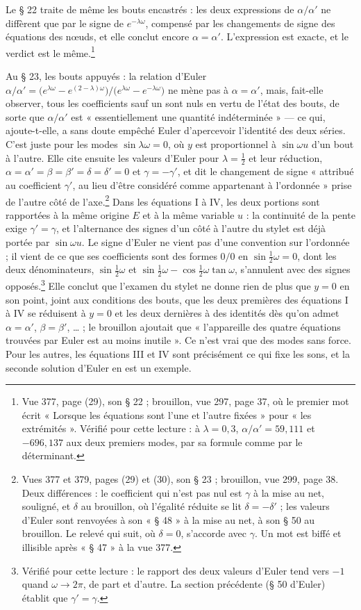 \documentclass[11pt,a4paper]{article}
\begin{document}
Le § 22 traite de même les bouts encastrés : les deux expressions de $\alpha/\alpha'$ ne diffèrent que par le signe de $e^{-\lambda\omega}$, compensé par les changements de signe des équations des nœuds, et elle conclut encore $\alpha=\alpha'$. L'expression est exacte, et le verdict est le même.\footnote{Vue 377, page (29), son § 22 ; brouillon, vue 297, page 37, où le premier mot écrit « Lorsque les équations sont l'une et l'autre fixées » pour « les extrémités ». Vérifié pour cette lecture : à $\lambda=0{,}3$, $\alpha/\alpha'=59{,}111$ et $-696{,}137$ aux deux premiers modes, par sa formule comme par le déterminant.}

Au § 23, les bouts appuyés : la relation d'Euler $\alpha/\alpha'=\bigl(e^{\lambda\omega}-e^{(2-\lambda)\omega}\bigr)/\bigl(e^{\lambda\omega}-e^{-\lambda\omega}\bigr)$ ne mène pas à $\alpha=\alpha'$, mais, fait-elle observer, tous les coefficients sauf un sont nuls en vertu de l'état des bouts, de sorte que $\alpha/\alpha'$ est « essentiellement une quantité indéterminée » — ce qui, ajoute-t-elle, a sans doute empêché Euler d'apercevoir l'identité des deux séries. C'est juste pour les modes $\sin\lambda\omega=0$, où $y$ est proportionnel à $\sin\omega u$ d'un bout à l'autre. Elle cite ensuite les valeurs d'Euler pour $\lambda=\frac12$ et leur réduction, $\alpha=\alpha'=\beta=\beta'=\delta=\delta'=0$ et $\gamma=-\gamma'$, et dit le changement de signe « attribué au coefficient $\gamma'$, au lieu d'être considéré comme appartenant à l'ordonnée » prise de l'autre côté de l'axe.\footnote{Vues 377 et 379, pages (29) et (30), son § 23 ; brouillon, vue 299, page 38. Deux différences : le coefficient qui n'est pas nul est $\gamma$ à la mise au net, souligné, et $\delta$ au brouillon, où l'égalité réduite se lit $\delta=-\delta'$ ; les valeurs d'Euler sont renvoyées à son « § 48 » à la mise au net, à son § 50 au brouillon. Le relevé qui suit, où $\delta=0$, s'accorde avec $\gamma$. Un mot est biffé et illisible après « § 47 » à la vue 377.} Dans les équations I à IV, les deux portions sont rapportées à la même origine $E$ et à la même variable $u$ : la continuité de la pente exige $\gamma'=\gamma$, et l'alternance des signes d'un côté à l'autre du stylet est déjà portée par $\sin\omega u$. Le signe d'Euler ne vient pas d'une convention sur l'ordonnée ; il vient de ce que ses coefficients sont des formes $0/0$ en $\sin\frac12\omega=0$, dont les deux dénominateurs, $\sin\frac12\omega$ et $\sin\frac12\omega-\cos\frac12\omega\tan\omega$, s'annulent avec des signes opposés.\footnote{Vérifié pour cette lecture : le rapport des deux valeurs d'Euler tend vers $-1$ quand $\omega\to2\pi$, de part et d'autre. La section précédente (§ 50 d'Euler) établit que $\gamma'=\gamma$.} Elle conclut que l'examen du stylet ne donne rien de plus que $y=0$ en son point, joint aux conditions des bouts, que les deux premières des équations I à IV se réduisent à $y=0$ et les deux dernières à des identités dès qu'on admet $\alpha=\alpha'$, $\beta=\beta'$, … ; le brouillon ajoutait que « l'appareille des quatre équations trouvées par Euler est au moins inutile ». Ce n'est vrai que des modes sans force. Pour les autres, les équations III et IV sont précisément ce qui fixe les sons, et la seconde solution d'Euler en est un exemple.
\end{document}
